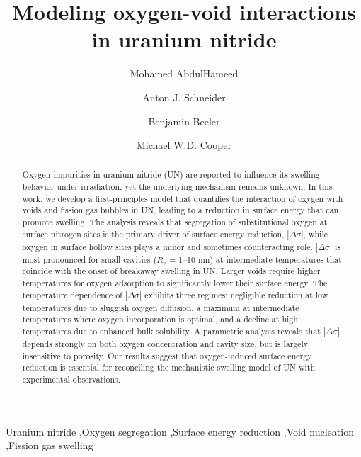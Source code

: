 \documentclass[preprint,12pt,sort&compress]{elsarticle}
\newcommand{\?}{\stackrel{?}{=}}
\begin{document}
\begin{frontmatter}

\title{Modeling oxygen-void interactions in uranium nitride}

\author[ncsu]{Mohamed AbdulHameed}
\author[lanl]{Anton J. Schneider}
\author[ncsu,inl]{Benjamin Beeler}
\author[lanl]{Michael W.D. Cooper}

\address[ncsu]{Department of Nuclear Engineering, North Carolina State University, Raleigh, NC 27695}
\address[lanl]{Los Alamos National Laboratory, Los Alamos, NM 87545}
\address[inl]{Idaho National Laboratory, Idaho Falls, ID 83415}

\begin{abstract}

Oxygen impurities in uranium nitride (UN) are reported to influence its swelling behavior under irradiation, yet the underlying mechanism remains unknown. In this work, we develop a first-principles model that quantifies the interaction of oxygen with voids and fission gas bubbles in UN, leading to a reduction in surface energy that can promote swelling. The analysis reveals that segregation of substitutional oxygen at surface nitrogen sites is the primary driver of surface energy reduction, $|\Delta \sigma|$, while oxygen in surface hollow sites plays a minor and sometimes counteracting role. $|\Delta \sigma|$ is most pronounced for small cavities ($R_v$ = 1--10 nm) at intermediate temperatures that coincide with the onset of breakaway swelling in UN. Larger voids require higher temperatures for oxygen adsorption to significantly lower their surface energy. The temperature dependence of $|\Delta \sigma|$ exhibits three regimes: negligible reduction at low temperatures due to sluggish oxygen diffusion, a maximum at intermediate temperatures where oxygen incorporation is optimal, and a decline at high temperatures due to enhanced bulk solubility. A parametric analysis reveals that $|\Delta \sigma|$ depends strongly on both oxygen concentration and cavity size, but is largely insensitive to porosity. Our results suggest that oxygen-induced surface energy reduction is essential for reconciling the mechanistic swelling model of UN with experimental observations.

\end{abstract}

\begin{keyword}
Uranium nitride \sep Oxygen segregation \sep Surface energy reduction \sep Void nucleation \sep Fission gas swelling
\end{keyword}

\end{frontmatter}
\end{document}
